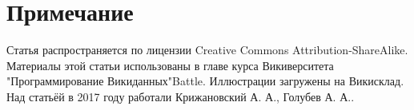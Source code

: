 \section{Примечание}

Статья распространяется по лицензии Creative Commons Attribution-ShareAlike. Материалы этой статьи использованы в главе курса Викиверситета "Программирование Викиданных"{Battle}. Иллюстрации загружены на Викисклад. Над статьёй в 2017 году работали Крижановский А. А., Голубев А. А..